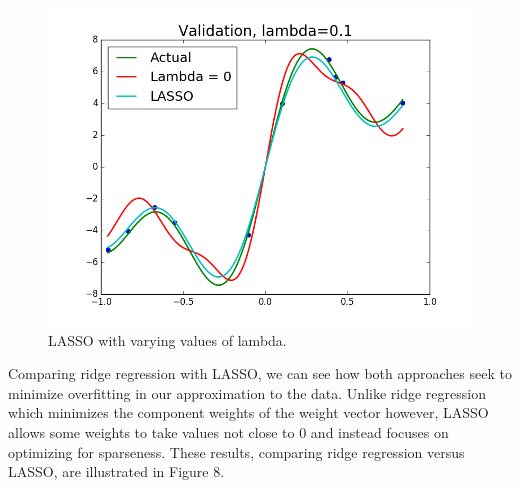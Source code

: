 \documentclass{article}
\begin{document}
\begin{figure}[width=\linewidth]
\begin{multicols}{2}
  \includegraphics[width=1.2\linewidth]{code/P4/validation,01.png}
\end{multicols}
\caption{LASSO with varying values of lambda.}
\end{figure}

Comparing ridge regression with LASSO, we can see how both approaches seek to minimize overfitting in our approximation to the data. Unlike ridge regression which minimizes the component weights of the weight vector however, LASSO allows some weights to take values not close to 0 and instead focuses on optimizing for sparseness. These results, comparing ridge regression versus LASSO, are illustrated in Figure 8.
\end{document}
